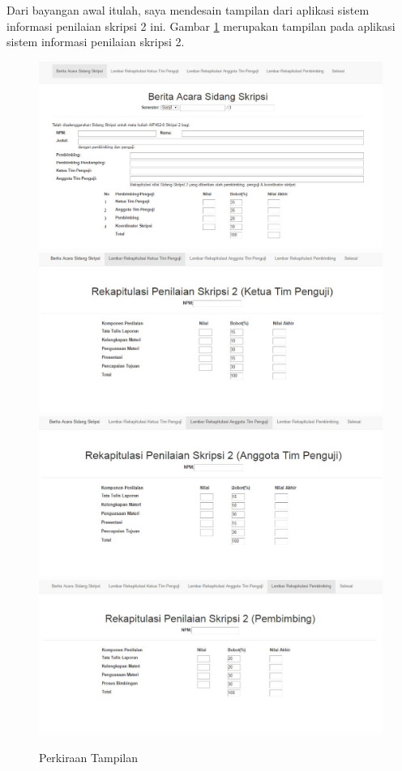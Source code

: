 	Dari bayangan awal itulah, saya mendesain tampilan dari aplikasi sistem informasi penilaian skripsi 2 ini. Gambar \ref{fig:tampilanapp} merupakan tampilan pada aplikasi sistem informasi penilaian skripsi 2.
	
	\begin{figure}[H]
		\centering
		\includegraphics[scale=0.5]{Gambar/tampilanapp1}
		\includegraphics[scale=0.5]{Gambar/tampilanapp2}
		\includegraphics[scale=0.5]{Gambar/tampilanapp3}
		\includegraphics[scale=0.5]{Gambar/tampilanapp4}
		\caption{Perkiraan Tampilan}
		\label{fig:tampilanapp}
	\end{figure}